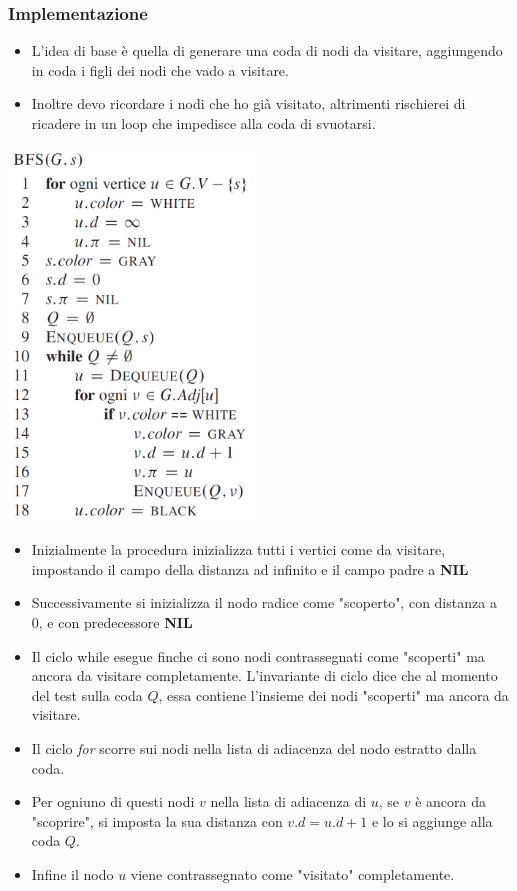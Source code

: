 \documentclass{article}
\begin{document}
\subsubsection*{Implementazione}
\begin{itemize}
  \item L'idea di base è quella di generare una coda di nodi da visitare, aggiungendo in coda i figli dei nodi che vado a visitare.
  \item Inoltre devo ricordare i nodi che ho già visitato, altrimenti rischierei di ricadere in un loop che impedisce alla coda di svuotarsi.
\end{itemize}
\begin{center}
  \includegraphics[width=0.5\textwidth]{bfs_pseudo-code.png}
\end{center}
\begin{itemize}
  \item Inizialmente la procedura inizializza tutti i vertici come da visitare, impostando il campo della distanza ad infinito e il campo padre a \textbf{NIL}
  \item Successivamente si inizializza il nodo radice come "scoperto", con distanza a 0, e con predecessore \textbf{NIL}
  \item Il ciclo while esegue finche ci sono nodi contrassegnati come "scoperti" ma ancora da visitare completamente. L'invariante di ciclo dice che al momento del test sulla coda \(Q\), essa contiene l'insieme dei nodi "scoperti" ma ancora da visitare.
  \item Il ciclo \emph{for} scorre sui nodi nella lista di adiacenza del nodo estratto dalla coda.
  \item Per ogniuno di questi nodi \(v\) nella lista di adiacenza di \(u\), se \(v\) è ancora da "scoprire", si imposta la sua distanza con \(v.d = u.d + 1\) e lo si aggiunge alla coda \(Q\).
  \item Infine il nodo \(u\) viene contrassegnato come "visitato" completamente.
\end{itemize}
\end{document}
